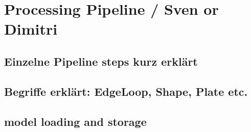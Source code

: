 \documentclass[../ClassicThesis.tex]{subfiles}
\begin{document}
\chapter{Processing Pipeline / Sven or Dimitri}\label{ch:processingPipeline}

\section{Einzelne Pipeline steps kurz erklärt}

\section{Begriffe erklärt: EdgeLoop, Shape, Plate etc.}

\section{model loading and storage}
\end{document}
